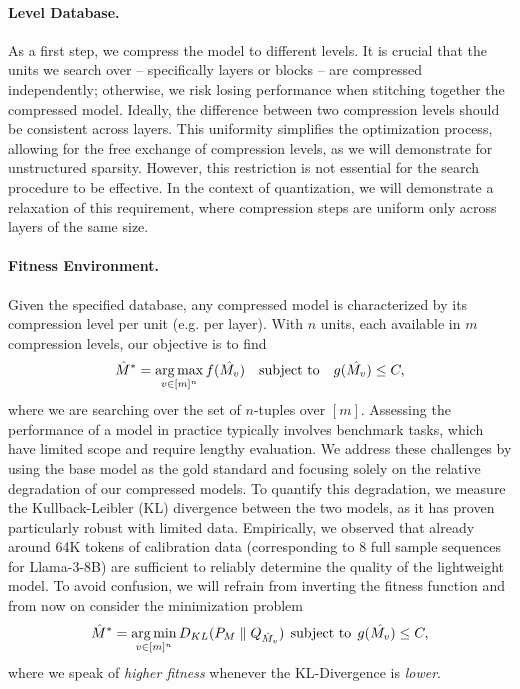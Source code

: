 \documentclass{article}
\theoremstyle{plain}
\theoremstyle{definition}
\theoremstyle{remark}
\begin{document}
\paragraph{Level Database.} As a first step, we compress the model to different levels. It is crucial that the units we search over -- specifically layers or blocks -- are compressed independently; otherwise, we risk losing performance when stitching together the compressed model. Ideally, the difference between two compression levels should be consistent across layers. This uniformity simplifies the optimization process, allowing for the free exchange of compression levels, as we will demonstrate for unstructured sparsity. However, this restriction is not essential for the search procedure to be effective. In the context of quantization, we will demonstrate a relaxation of this requirement, where compression steps are uniform only across layers of the same size. 




\paragraph{Fitness Environment.}
Given the specified database, any compressed model is characterized by its compression level per unit (e.g. per layer). With $n$ units, each available in $m$ compression levels, our objective is to find
\begin{displaymath}
    \hat{M}^* = \operatorname*{arg\,max}_{v \in [m]^n} f(\hat{M_v}) \quad \text{subject to} \quad g(\hat{M_v}) \leq C,
\end{displaymath}
where we are searching over the set of $n$-tuples over $[m]$. Assessing the performance of a model in practice typically involves benchmark tasks, which have limited scope and require lengthy evaluation. We address these challenges by using the base model as the gold standard and focusing solely on the relative degradation of our compressed models. To quantify this degradation, we measure the Kullback-Leibler (KL) divergence between the two models, as it has proven particularly robust with limited data. Empirically, we observed that already around 64K tokens of calibration data (corresponding to $8$ full sample sequences for Llama-3-8B) are sufficient to reliably determine the quality of the lightweight model. To avoid confusion, we will refrain from inverting the fitness function and from now on consider the minimization problem
\begin{displaymath}
    \hat{M}^* = \operatorname*{arg\,min}_{v \in [m]^n} D_{KL}(P_M \parallel Q_{\hat{M}_v}) \; \, \text{subject to} \; \, g(\hat{M_v}) \leq C,
\end{displaymath}
where we speak of \emph{higher fitness} whenever the KL-Divergence is \emph{lower}.
\end{document}
